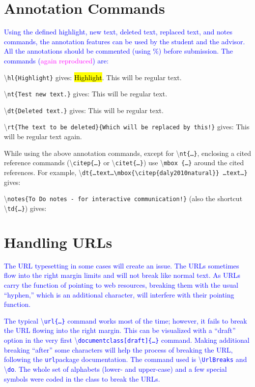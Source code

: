 \documentclass[phd,showframe]{ndsu-thesis-2022}
\newcommand\italk[1]{\textcolor{blue}{#1}}  %
\newcommand\cmd[1]{\textbackslash\texttt{#1}}  %
\begin{document}
\section{Annotation Commands}
\italk{Using the defined highlight, new text, deleted text, replaced text, and notes commands, the annotation features can be used by the student and the advisor. All the annotations should be commented (using \%) before submission. The commands (\textcolor{magenta}{again reproduced}) are:} 

\textbackslash\texttt{hl\{Highlight\}} gives: \hl{Highlight}. This will be regular text. 

\textbackslash\texttt{nt\{Test new text.\}} gives:  This will be regular text. 

\textbackslash\texttt{dt\{Deleted text.\}} gives:  This will be regular text. 

\textbackslash\texttt{rt\{The text to be deleted\}\{Which will be replaced by this!\}} gives:  This will be regular text again. 

\vspace{1.5ex}
While using the above annotation commands, except for \cmd{nt\{\ldots\}}, enclosing a cited reference commands (\cmd{citep\{\ldots\}} or \cmd{citet\{\ldots\}}) use \cmd{mbox
\{\ldots\}} around the cited references. For example, \cmd{dt\{\ldots text\ldots \cmd{mbox\{\cmd{citep\{daly2010natural\}}\}} \ldots text\ldots\}} 
gives:  

\vspace{1.5ex}
\textbackslash\texttt{notes\{To Do notes - for interactive communication!\}} (also the shortcut \cmd{td\{\ldots\}}) gives:  

\mysectop
\section{Handling URLs}
\italk{The URL typesetting in some cases will create an issue. The URLs sometimes flow into the right margin limits and will not break like normal text. As URLs carry the function of pointing to web resources, breaking them with the usual ``hyphen,'' which is an additional character, will interfere with their pointing function.} 

\italk{The typical \cmd{url\{\ldots\}} command works most of the time; however, it fails to break the URL flowing into the right margin. This can be visualized with a ``draft'' option in the very first \cmd{documentclass[draft]\{\ldots\}} command. Making additional breaking ``after'' some characters will help the process of breaking the URL, following the \texttt{url}\cptp package documentation. The command used is \cmd{UrlBreaks} and \cmd{do}. The whole set of alphabets (lower- and upper-case) and a few special symbols were coded in the class to break the URLs.}
\end{document}
